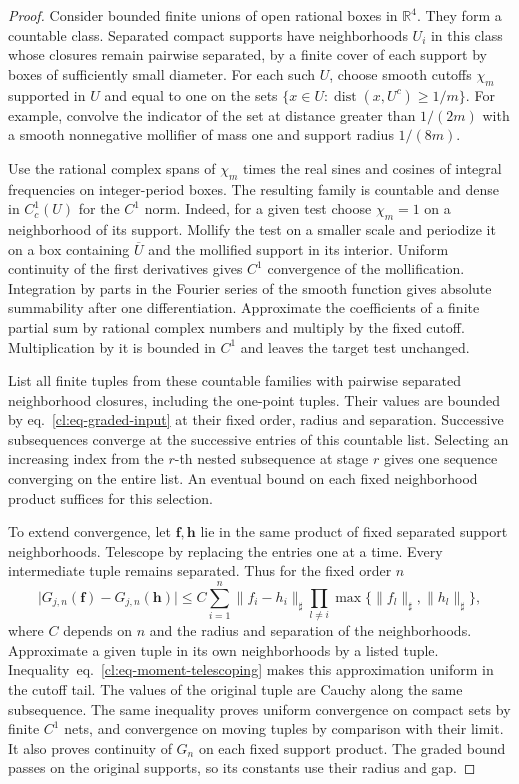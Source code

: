 \documentclass[11pt,letterpaper,reqno]{amsart}
\numberwithin{equation}{section}
\renewcommand{\eqref}[1]{\textup{eq.~\ref{#1}}}
\theoremstyle{definition}
\theoremstyle{remark}
\begin{document}
\begin{proof}
Consider bounded finite unions of open rational boxes in
\(\mathbb R^4\). They form a countable class. Separated compact
supports have neighborhoods \(U_i\) in this class whose closures
remain pairwise separated, by a finite cover of each support by
boxes of sufficiently small diameter. For each such \(U\), choose
smooth cutoffs \(\chi_m\) supported in \(U\) and equal to one on
the sets \(\{x\in U:\operatorname{dist}(x,U^c)\ge1/m\}\).
For example, convolve the indicator of the set at distance
greater than \(1/(2m)\) with a smooth nonnegative mollifier of
mass one and support radius \(1/(8m)\).

Use the rational complex spans of \(\chi_m\) times the real sines
and cosines of integral frequencies on integer-period boxes.
The resulting family is countable and dense in \(C_c^1(U)\)
for the \(C^1\) norm. Indeed, for a given test choose \(\chi_m=1\)
on a neighborhood of its support. Mollify the test on a smaller
scale and periodize it on a box containing \(\overline U\) and
the mollified support in its interior. Uniform continuity of the
first derivatives gives \(C^1\) convergence of the mollification.
Integration by parts in the Fourier series of the smooth function
gives absolute summability after one differentiation. Approximate
the coefficients of a finite partial sum by rational complex
numbers and multiply by the fixed cutoff. Multiplication by it
is bounded in \(C^1\) and leaves the target test unchanged.

List all finite tuples from these countable families with pairwise
separated neighborhood closures, including the one-point tuples.
Their values are bounded by \eqref{cl:eq-graded-input} at their
fixed order, radius and separation. Successive subsequences
converge at the successive entries of this countable list.
Selecting an increasing index from the \(r\)-th nested subsequence
at stage \(r\) gives one sequence converging on the entire list.
An eventual bound on each fixed neighborhood product suffices
for this selection.

To extend convergence, let \(\mathbf f,\mathbf h\) lie in the same
product of fixed separated support neighborhoods. Telescope by
replacing the entries one at a time. Every intermediate tuple
remains separated. Thus for the fixed order \(n\)
\begin{equation}\label{cl:eq-moment-telescoping}
 \bigl|G_{j,n}(\mathbf f)-G_{j,n}(\mathbf h)\bigr|
 \le C\sum_{i=1}^n \|f_i-h_i\|_\sharp
      \prod_{l\ne i}\max\{\|f_l\|_\sharp,\|h_l\|_\sharp\},
\end{equation}
where \(C\) depends on \(n\) and the radius and separation of the
neighborhoods. Approximate a given tuple in its own neighborhoods
by a listed tuple. Inequality~\eqref{cl:eq-moment-telescoping}
makes this approximation uniform in the cutoff tail. The values
of the original tuple are Cauchy along the same subsequence.
The same inequality proves uniform convergence on compact sets
by finite \(C^1\) nets, and convergence on moving tuples by
comparison with their limit. It also proves continuity of \(G_n\)
on each fixed support product. The graded bound passes on the
original supports, so its constants use their radius and gap.


\end{proof}
\end{document}
